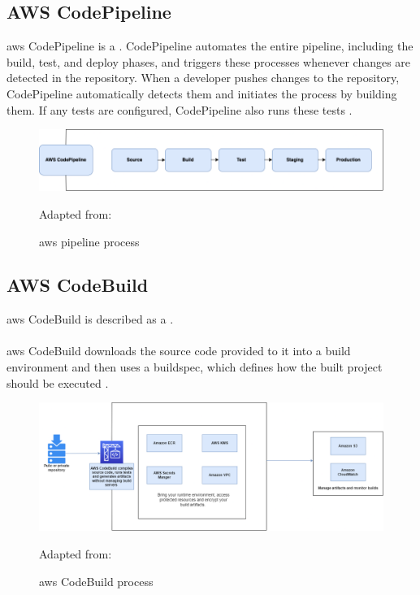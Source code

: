 \subsection{AWS CodePipeline}
\acrshort{aws} CodePipeline is a  \cite{AWSCodePipeline}.
\newpage
CodePipeline automates the entire \gls{pipeline}, including the build, test, and deploy phases, and triggers these processes whenever changes are detected in the repository. When a developer pushes changes to the repository, CodePipeline automatically detects them and initiates the process by building them. If any tests are configured, CodePipeline also runs these tests \cite{AWSCodePipeline1}.
\begin{figure}[H]
    \centering
    \includegraphics[scale=0.4]{Images/CodePipeline.png}
    \caption{\acrshort{aws} \gls{pipeline} process}Adapted from: \cite{AWSCodePipeline2}
    \label{fig: AWS CodePipeline Process}
\end{figure}

\subsection{AWS CodeBuild}
\acrshort{aws} CodeBuild is described as a  \cite{AWSCodeBuild}.
\\~\\
\acrshort{aws} CodeBuild downloads the source code provided to it into a build environment and then uses a \gls{buildspec}, which defines how the built project should be executed \cite{AWSCodeBuild1}.
\begin{figure}[H]
    \centering
    \includegraphics[scale=0.3]{Images/Codebuild.png}
    \caption{\acrshort{aws} CodeBuild process} Adapted from: \cite{AWSCodeBuild}
    \label{fig: AWS CodeBuild Process}
\end{figure}
\newpage
